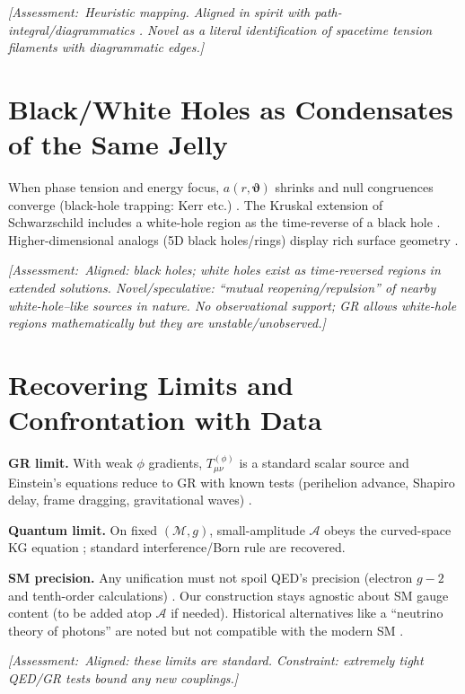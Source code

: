 \documentclass[reprint,amsmath,amssymb,aps]{revtex4-2}
\newcommand{\M}{\mathcal{M}}                   %
\newcommand{\g}{g}                             %
\newcommand{\A}{\mathcal{A}}                   %
\newcommand{\T}{T}                             %
\newcommand{\angb}{\boldsymbol{\vartheta}}     %
\newcommand{\Assessment}[1]{\par\smallskip\noindent\textit{\color{blue}[Assessment:\ #1]}\par\smallskip}
\begin{document}
\Assessment{Heuristic mapping. Aligned in spirit with path-integral/diagrammatics \cite{Feynman1948,Dyson1949}. Novel as a literal identification of spacetime tension filaments with diagrammatic edges.}

\section{Black/White Holes as Condensates of the Same Jelly}
When phase tension and energy focus, $a(r,\angb)$ shrinks and null congruences converge (black-hole trapping: Kerr etc.) \cite{Kerr1963,Kraniotis2005}. The Kruskal extension of Schwarzschild includes a white-hole region as the time-reverse of a black hole \cite{Kruskal1960}. Higher-dimensional analogs (5D black holes/rings) display rich surface geometry \cite{FrolovGoswami2007}.

\Assessment{Aligned: black holes; white holes exist as time-reversed regions in extended solutions. Novel/speculative: ``mutual reopening/repulsion'' of nearby white-hole–like sources in nature. No observational support; GR allows white-hole regions mathematically but they are unstable/unobserved.}

\section{Recovering Limits and Confrontation with Data}
\textbf{GR limit.} With weak $\phi$ gradients, $\T^{(\phi)}_{\mu\nu}$ is a standard scalar source and Einstein’s equations reduce to GR with known tests (perihelion advance, Shapiro delay, frame dragging, gravitational waves) \cite{Will2014,GPB2011,LIGO2016,Kraniotis2005}.

\textbf{Quantum limit.} On fixed $(\M,\g)$, small-amplitude $\A$ obeys the curved-space KG equation \cite{BirrellDavies,ParkerToms}; standard interference/Born rule are recovered.

\textbf{SM precision.} Any unification must not spoil QED’s precision (electron $g-2$ and tenth-order calculations) \cite{Hanneke2008,Aoyama2012,Parker2018}. Our construction stays agnostic about SM gauge content (to be added atop $\A$ if needed). Historical alternatives like a ``neutrino theory of photons'' are noted but not compatible with the modern SM \cite{Perkins1965,PDG2024}.

\Assessment{Aligned: these limits are standard. Constraint: extremely tight QED/GR tests bound any new couplings.}
\end{document}
